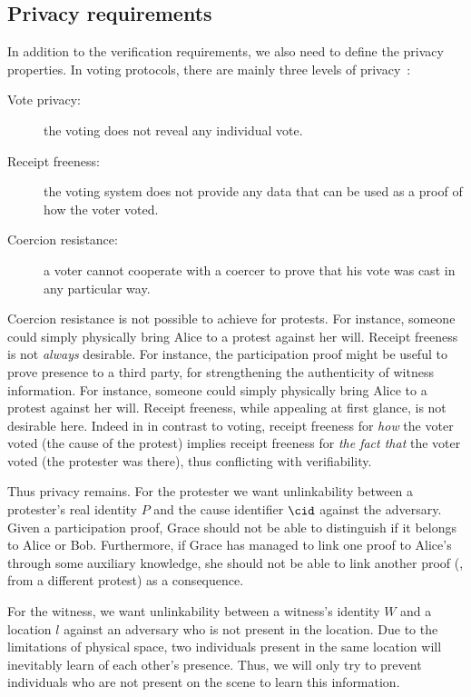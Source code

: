 \subsection{Privacy requirements}%
\label{privacy-properties}

In addition to the verification requirements, we also need to define the privacy properties.
In voting protocols, there are mainly three levels of 
privacy~\cite{VerifyingPrivacyPropertiesOfVotingProtocols}:
\begin{description}
  \item[Vote privacy:] the voting does not reveal any individual vote.
  \item[Receipt freeness:] the voting system does not provide any data that can be used as a proof of how the voter voted.
  \item[Coercion resistance:] a voter cannot cooperate with a coercer to prove that his vote was cast in any particular way.
\end{description}

Coercion resistance is not possible to achieve for protests.
For instance, someone could simply physically bring Alice to a protest against her will.
Receipt freeness is not \emph{always} desirable.
For instance, the participation proof might be useful to prove presence to a third party, \eg for strengthening the authenticity of witness information.
For instance, someone could simply physically bring Alice to a protest against her will.
Receipt freeness, while appealing at first glance, is not desirable here.
Indeed in in contrast to voting, receipt freeness for \emph{how} the voter voted (\ie the cause of the protest) implies receipt freeness for \emph{the fact that} the voter voted (\ie the protester was there), thus conflicting with verifiability.  

Thus privacy remains.
For the protester we want unlinkability between a protester's real identity \(P\) and the cause identifier \(\cid\) against the adversary.
Given a participation proof, Grace should not be able to distinguish if it belongs to Alice or Bob.
Furthermore, if Grace has managed to link one proof to Alice's through some auxiliary knowledge, she should not be able to link another proof (\eg, from a different protest) as a consequence.

For the witness, we want unlinkability between a witness's identity \(W\) and a location \(l\) against an adversary who is not present in the location.
Due to the limitations of physical space, two individuals present in the same location will inevitably learn of each other's presence.
Thus, we will only try to prevent individuals who are not present on the scene to learn this information.

